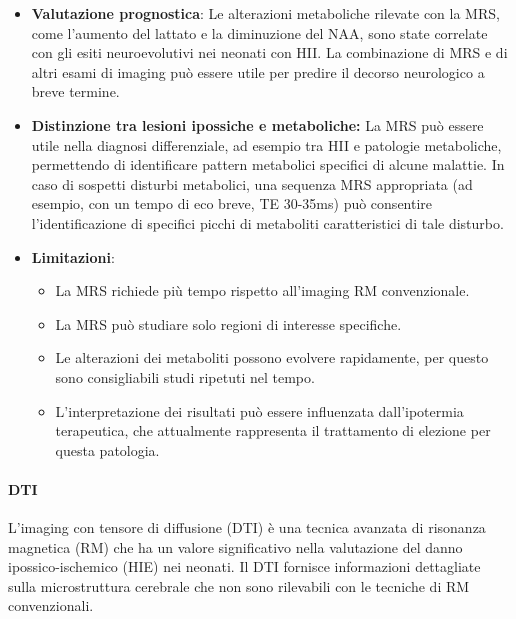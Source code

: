 \begin{itemize}
	\item
	\textbf{Valutazione prognostica}: Le alterazioni metaboliche rilevate con la MRS, come l'aumento del lattato e la diminuzione del NAA, sono state correlate con gli esiti neuroevolutivi nei neonati con HII. La combinazione di MRS e di altri esami di imaging può essere utile per predire il decorso neurologico a breve termine.
	\item
	\textbf{Distinzione tra lesioni ipossiche e metaboliche:} La MRS può essere utile nella diagnosi differenziale, ad esempio tra HII e patologie metaboliche, permettendo di identificare pattern metabolici specifici di alcune malattie. In caso di sospetti disturbi metabolici, una sequenza MRS appropriata (ad esempio, con un tempo di eco breve, TE 30-35ms) può consentire l'identificazione di specifici picchi di metaboliti caratteristici di tale disturbo.
	\item
	\textbf{Limitazioni}:
	
	\begin{itemize}
		\tightlist
		\item
		La MRS richiede più tempo rispetto all'imaging RM convenzionale.
		\item
		La MRS può studiare solo regioni di interesse specifiche.
		\item
		Le alterazioni dei metaboliti possono evolvere rapidamente, per questo sono consigliabili studi ripetuti nel tempo.
		\item
		L'interpretazione dei risultati può essere influenzata dall'ipotermia terapeutica, che attualmente rappresenta il trattamento di elezione per questa patologia.
	\end{itemize}
\end{itemize}

\paragraph{DTI} L'imaging con tensore di diffusione (DTI) è una tecnica avanzata di risonanza magnetica (RM) che ha un valore significativo nella valutazione del danno ipossico-ischemico (HIE) nei neonati. Il DTI fornisce informazioni dettagliate sulla microstruttura cerebrale che non sono rilevabili con le tecniche di RM convenzionali.

